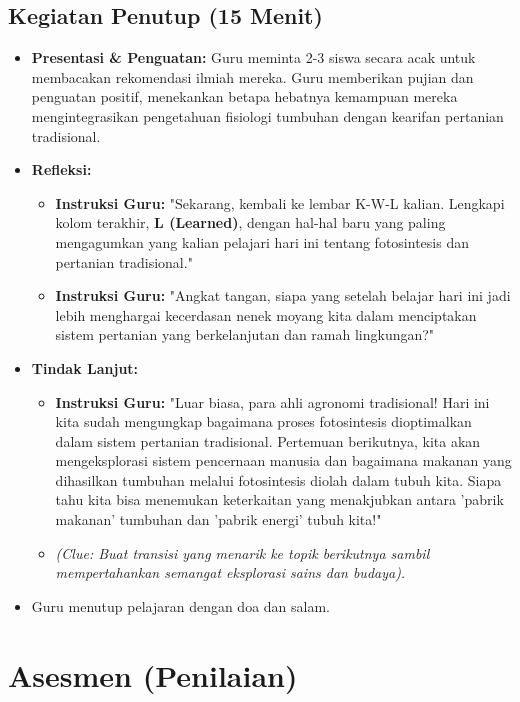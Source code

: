 \documentclass[a4paper,12pt]{article}
\begin{document}
\subsection{Kegiatan Penutup (15 Menit)}
\begin{itemize}
\item \textbf{Presentasi \& Penguatan:} Guru meminta 2-3 siswa secara acak untuk membacakan rekomendasi ilmiah mereka. Guru memberikan pujian dan penguatan positif, menekankan betapa hebatnya kemampuan mereka mengintegrasikan pengetahuan fisiologi tumbuhan dengan kearifan pertanian tradisional.
\item \textbf{Refleksi:}
    \begin{itemize}
    \item \textbf{Instruksi Guru:} "Sekarang, kembali ke lembar K-W-L kalian. Lengkapi kolom terakhir, \textbf{L (Learned)}, dengan hal-hal baru yang paling mengagumkan yang kalian pelajari hari ini tentang fotosintesis dan pertanian tradisional."
    \item \textbf{Instruksi Guru:} "Angkat tangan, siapa yang setelah belajar hari ini jadi lebih menghargai kecerdasan nenek moyang kita dalam menciptakan sistem pertanian yang berkelanjutan dan ramah lingkungan?"
    \end{itemize}
\item \textbf{Tindak Lanjut:}
    \begin{itemize}
    \item \textbf{Instruksi Guru:} "Luar biasa, para ahli agronomi tradisional! Hari ini kita sudah mengungkap bagaimana proses fotosintesis dioptimalkan dalam sistem pertanian tradisional. Pertemuan berikutnya, kita akan mengeksplorasi sistem pencernaan manusia dan bagaimana makanan yang dihasilkan tumbuhan melalui fotosintesis diolah dalam tubuh kita. Siapa tahu kita bisa menemukan keterkaitan yang menakjubkan antara 'pabrik makanan' tumbuhan dan 'pabrik energi' tubuh kita!"
    \item \textit{(Clue: Buat transisi yang menarik ke topik berikutnya sambil mempertahankan semangat eksplorasi sains dan budaya).}
    \end{itemize}
\item Guru menutup pelajaran dengan doa dan salam.
\end{itemize}

\section{Asesmen (Penilaian)}
\end{document}
